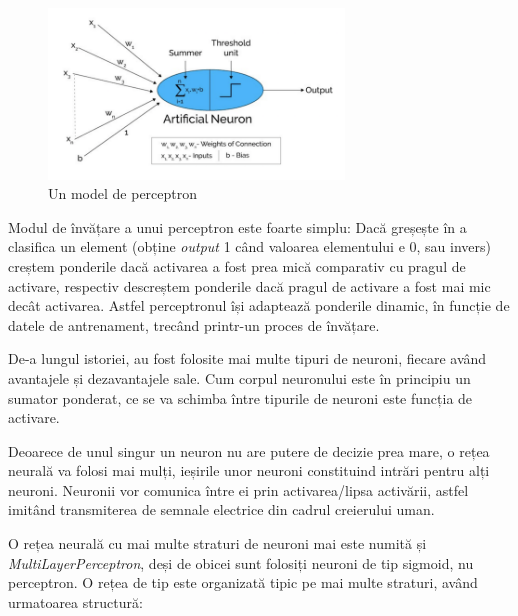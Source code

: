 \begin{figure}[!htbp]
    \begin{center}
        \includegraphics[width=0.7\textwidth]{images/perceptron.png}
        \caption{Un model de perceptron\cite{adi-from-perceptron}}
    \end{center}
\end{figure}
\label{perceptron}

Modul de învățare a unui perceptron este foarte simplu: Dacă greșește în a clasifica un element (obține \textit{output} 1 când valoarea elementului e 0, sau invers) creștem ponderile dacă activarea a fost prea mică comparativ cu pragul de activare, respectiv descreștem ponderile dacă pragul de activare a fost mai mic decât activarea.
Astfel perceptronul își adaptează ponderile dinamic, în funcție de datele de antrenament, trecând printr-un proces de învățare.

De-a lungul istoriei, au fost folosite mai multe tipuri de neuroni, fiecare având avantajele și dezavantajele sale. Cum corpul neuronului este în principiu un sumator ponderat, ce se va schimba între tipurile de neuroni este funcția de activare.

Deoarece de unul singur un neuron nu are putere de decizie prea mare, o rețea neurală va folosi mai mulți,  ieșirile unor neuroni constituind intrări pentru alți neuroni. Neuronii vor comunica între ei prin activarea/lipsa activării, astfel imitând transmiterea de semnale electrice din cadrul creierului uman. 

O rețea neurală cu mai multe straturi de neuroni mai este numită și \textit{MultiLayerPerceptron}, deși de obicei sunt folosiți neuroni de tip sigmoid, nu perceptron. O rețea de tip este organizată tipic pe mai multe straturi, având urmatoarea structură:

